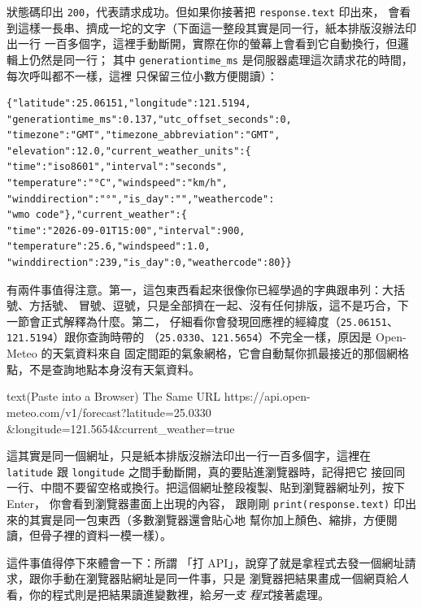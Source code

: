 狀態碼印出 \texttt{200}，代表請求成功。但如果你接著把 \texttt{response.text} 印出來，
會看到這樣一長串、擠成一坨的文字（下面這一整段其實是同一行，紙本排版沒辦法印出一行
一百多個字，這裡手動斷開，實際在你的螢幕上會看到它自動換行，但邏輯上仍然是同一行；
其中 \texttt{generationtime\_ms} 是伺服器處理這次請求花的時間，每次呼叫都不一樣，這裡
只保留三位小數方便閱讀）：

\begin{verbatim}
{"latitude":25.06151,"longitude":121.5194,
"generationtime_ms":0.137,"utc_offset_seconds":0,
"timezone":"GMT","timezone_abbreviation":"GMT",
"elevation":12.0,"current_weather_units":{
"time":"iso8601","interval":"seconds",
"temperature":"°C","windspeed":"km/h",
"winddirection":"°","is_day":"","weathercode":
"wmo code"},"current_weather":{
"time":"2026-09-01T15:00","interval":900,
"temperature":25.6,"windspeed":1.0,
"winddirection":239,"is_day":0,"weathercode":80}}
\end{verbatim}

有兩件事值得注意。第一，這包東西看起來很像你已經學過的字典跟串列：大括號、方括號、
冒號、逗號，只是全部擠在一起、沒有任何排版，這不是巧合，下一節會正式解釋為什麼。第二，
仔細看你會發現回應裡的經緯度（\texttt{25.06151}、\texttt{121.5194}）跟你查詢時帶的
（\texttt{25.0330}、\texttt{121.5654}）不完全一樣，原因是 Open-Meteo 的天氣資料來自
固定間距的氣象網格，它會自動幫你抓最接近的那個網格點，不是查詢地點本身沒有天氣資料。

\begin{example}[label=ex:browser-check]{text}{(Paste into a Browser) The Same URL}
https://api.open-meteo.com/v1/forecast?latitude=25.0330
&longitude=121.5654&current_weather=true
\end{example}

這其實是同一個網址，只是紙本排版沒辦法印出一行一百多個字，這裡在
\texttt{latitude} 跟 \texttt{longitude} 之間手動斷開，真的要貼進瀏覽器時，記得把它
接回同一行、中間不要留空格或換行。把這個網址整段複製、貼到瀏覽器網址列，按下 Enter，
你會看到瀏覽器畫面上出現的內容，
跟剛剛 \texttt{print(response.text)} 印出來的其實是同一包東西（多數瀏覽器還會貼心地
幫你加上顏色、縮排，方便閱讀，但骨子裡的資料一模一樣）。

這件事值得停下來體會一下：所謂
「打 API」，說穿了就是拿程式去發一個網址請求，跟你手動在瀏覽器貼網址是同一件事，只是
瀏覽器把結果畫成一個網頁給\emph{人}看，你的程式則是把結果讀進變數裡，給\emph{另一支
程式}接著處理。


